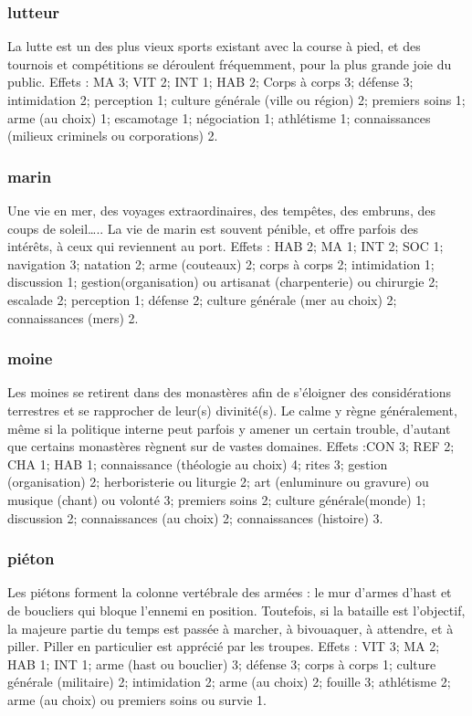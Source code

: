 \documentclass[10pt,a4paper,twocolumn]{book}
\begin{document}
\subsubsection{lutteur}
La lutte est un des plus vieux sports existant avec la course à pied, et des tournois et compétitions se déroulent fréquemment, pour la plus grande joie du public.
Effets : MA 3; VIT 2; INT 1; HAB 2; Corps à corps 3; défense 3; intimidation 2; perception 1; culture générale (ville ou région) 2; premiers soins 1; arme (au choix) 1; escamotage 1; négociation 1; athlétisme 1; connaissances (milieux criminels ou corporations) 2.

\subsubsection{marin}
Une vie en mer, des voyages extraordinaires, des tempêtes, des embruns, des coups de soleil….. La vie de marin est souvent pénible, et offre parfois des intérêts, à ceux qui reviennent au port.
Effets : HAB 2; MA 1; INT 2; SOC 1; navigation 3; natation 2; arme (couteaux) 2; corps à corps 2; intimidation 1; discussion 1; gestion(organisation) ou artisanat (charpenterie) ou chirurgie 2; escalade 2; perception 1; défense 2; culture générale (mer au choix) 2; connaissances (mers) 2.
\subsubsection{moine}
Les moines se retirent dans des monastères afin de s’éloigner des considérations terrestres et se rapprocher de leur(s) divinité(s). Le calme y règne généralement, même si la politique interne peut parfois y amener un certain trouble, d’autant que certains monastères règnent sur de vastes domaines.
Effets :CON 3; REF 2; CHA 1; HAB 1; connaissance (théologie au choix) 4;  rites 3; gestion (organisation) 2; herboristerie ou liturgie 2; art (enluminure ou gravure) ou musique (chant) ou volonté 3; premiers soins 2; culture générale(monde) 1; discussion 2; connaissances (au choix) 2; connaissances (histoire) 3.
\subsubsection{piéton}
Les piétons forment la colonne vertébrale des armées : le mur d’armes d’hast et de boucliers qui bloque l’ennemi en position. Toutefois, si la bataille est l’objectif, la majeure partie du temps est passée à marcher, à bivouaquer, à attendre, et à piller. Piller en particulier est apprécié par les troupes.
Effets : VIT 3; MA 2; HAB 1; INT 1; arme (hast ou bouclier) 3; défense 3; corps à corps 1; culture générale (militaire) 2; intimidation 2; arme (au choix) 2; fouille 3; athlétisme 2; arme (au choix) ou premiers soins ou survie 1.
\end{document}
